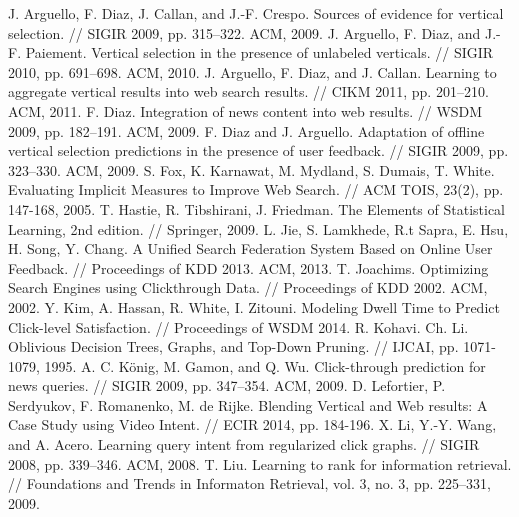\documentclass[12pt,a4paper]{report}
\renewcommand{\bibname}{Список литературы}
\begin{document}
\renewcommand{\bibname}{Список литературы}
\begin{thebibliography}{@}
   J. Arguello, F. Diaz, J. Callan, and J.-F. Crespo. Sources of evidence for vertical selection. // SIGIR 2009, pp. 315–322. ACM, 2009.
   J. Arguello, F. Diaz, and J.-F. Paiement. Vertical selection in the presence of unlabeled verticals. // SIGIR 2010, pp. 691–698. ACM, 2010.
   J. Arguello, F. Diaz, and J. Callan. Learning to aggregate vertical results into web search results. // CIKM 2011, pp. 201–210. ACM, 2011.
    F. Diaz. Integration of news content into web results. // WSDM 2009, pp. 182–191. ACM, 2009.
   F. Diaz and J. Arguello. Adaptation of offline vertical selection predictions in the presence of user feedback. // SIGIR 2009, pp. 323–330. ACM, 2009.
   S. Fox, K. Karnawat, M. Mydland, S. Dumais, T. White. Evaluating Implicit Measures to Improve Web Search. // ACM TOIS, 23(2), pp. 147-168, 2005.    
   T. Hastie, R. Tibshirani, J. Friedman. The Elements of Statistical Learning, 2nd edition. // Springer, 2009.  
   L. Jie, S. Lamkhede, R.t Sapra, E. Hsu, H. Song, Y. Chang. A Unified Search Federation System Based on Online User Feedback. // Proceedings of KDD 2013. ACM, 2013.    
   T. Joachims. Optimizing Search Engines using Clickthrough Data. // Proceedings of KDD 2002. ACM, 2002.
   Y. Kim, A. Hassan, R. White, I. Zitouni. Modeling Dwell Time to Predict Click-level Satisfaction. // Proceedings of WSDM 2014.
   R. Kohavi. Ch. Li. Oblivious Decision Trees, Graphs, and Top-Down Pruning. // IJCAI, pp. 1071-1079, 1995.
   A. C. K\"{o}nig, M. Gamon, and Q. Wu. Click-through prediction for news queries. // SIGIR 2009, pp. 347–354. ACM, 2009.
   D. Lefortier, P. Serdyukov, F. Romanenko, M. de Rijke. Blending Vertical and Web results: A Case Study using Video Intent. // ECIR 2014, pp. 184-196.
   X. Li, Y.-Y. Wang, and A. Acero. Learning query intent from regularized click graphs. // SIGIR 2008, pp. 339–346. ACM, 2008.
   T. Liu. Learning to rank for information retrieval. // Foundations and Trends in Informaton Retrieval, vol. 3, no. 3, pp. 225–331, 2009. 

\end{thebibliography}
\end{document}
